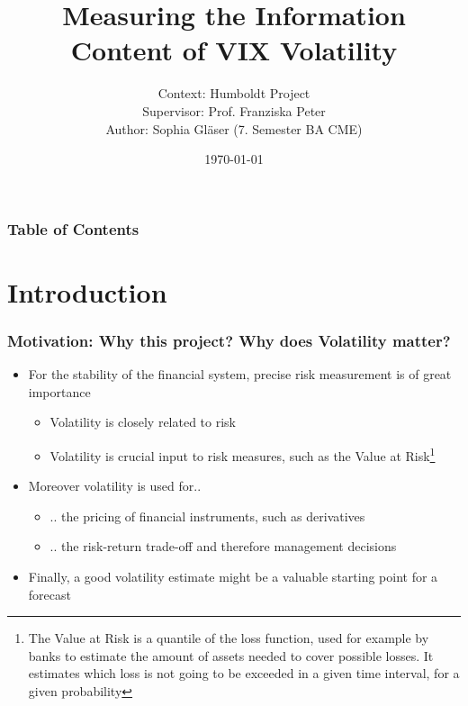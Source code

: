 \documentclass[aspectratio=169]{beamer}
\title{Measuring the Information Content of VIX Volatility}
\author{Context: Humboldt Project\\
Supervisor: Prof. Franziska Peter\\
Author: Sophia Gläser (7. Semester BA CME)}
\date{\small \today}
\begin{document}
\begin{frame}
\maketitle
\end{frame}

\begin{frame}
\frametitle{Table of Contents}
\tableofcontents
\end{frame}

\section{Introduction}

\begin{frame}
\frametitle{Motivation: Why this project? Why does Volatility matter?}
	\begin{itemize}
	\item For the stability of the financial system, precise risk measurement is of great importance
		\begin{itemize}
		\item Volatility is closely related to risk 
		\item Volatility is crucial input to risk measures, such as the Value at Risk\footnote{The Value at Risk is a quantile of the loss function, used for example by banks to estimate the amount of assets needed to cover possible losses. It estimates which loss is not going to be exceeded in a given time interval, for a given probability}
		\end{itemize}
	\item Moreover volatility is used for..
		\begin{itemize}
		\item .. the pricing of financial instruments, such as derivatives
		\item .. the risk-return trade-off and therefore management decisions
		\end{itemize}
	\item Finally, a good volatility estimate might be a valuable starting point for a forecast
	\end{itemize}
\end{frame}
\end{document}
